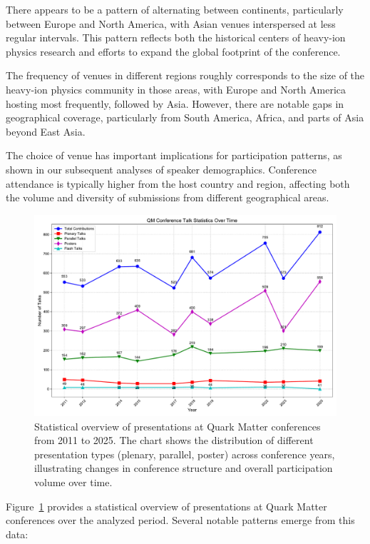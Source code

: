 \documentclass[a4paper,11pt]{article}
\begin{document}
There appears to be a pattern of alternating between continents, particularly between Europe and North America, with Asian venues interspersed at less regular intervals. This pattern reflects both the historical centers of heavy-ion physics research and efforts to expand the global footprint of the conference.

The frequency of venues in different regions roughly corresponds to the size of the heavy-ion physics community in those areas, with Europe and North America hosting most frequently, followed by Asia. However, there are notable gaps in geographical coverage, particularly from South America, Africa, and parts of Asia beyond East Asia.

The choice of venue has important implications for participation patterns, as shown in our subsequent analyses of speaker demographics. Conference attendance is typically higher from the host country and region, affecting both the volume and diversity of submissions from different geographical areas.

\begin{figure}[H]
\centering
\includegraphics[width=\textwidth]{figures/QM_talk_statistics.pdf}
\caption{Statistical overview of presentations at Quark Matter conferences from 2011 to 2025. The chart shows the distribution of different presentation types (plenary, parallel, poster) across conference years, illustrating changes in conference structure and overall participation volume over time.}
\label{fig:talk_statistics}
\end{figure}

Figure~\ref{fig:talk_statistics} provides a statistical overview of presentations at Quark Matter conferences over the analyzed period. Several notable patterns emerge from this data:
\end{document}

